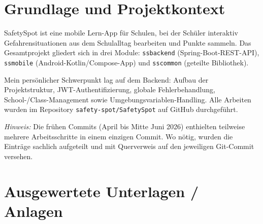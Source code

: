 
\maketitle
\setcounter{section}{0}

\section{Grundlage und Projektkontext}

SafetySpot ist eine mobile Lern-App für Schulen, bei der Schüler interaktiv
Gefahrensituationen aus dem Schulalltag bearbeiten und Punkte sammeln.
Das Gesamtprojekt gliedert sich in drei Module:
\texttt{ssbackend} (Spring-Boot-REST-API), \texttt{ssmobile}
(Android-Kotlin/Compose-App) und \texttt{sscommon} (geteilte Bibliothek).

Mein persönlicher Schwerpunkt lag auf dem Backend:
Aufbau der Projektstruktur, JWT-Authentifizierung, globale Fehlerbehandlung,
School-/Class-Management sowie Umgebungsvariablen-Handling.
Alle Arbeiten wurden im Repository \texttt{safety-spot/SafetySpot} auf GitHub
durchgeführt.

\textit{Hinweis:} Die frühen Commits (April bis Mitte Juni 2026) enthielten
teilweise mehrere Arbeitsschritte in einem einzigen Commit.
Wo nötig, wurden die Einträge sachlich aufgeteilt und mit Querverweis auf den
jeweiligen Git-Commit versehen.

\section{Ausgewertete Unterlagen / Anlagen}

